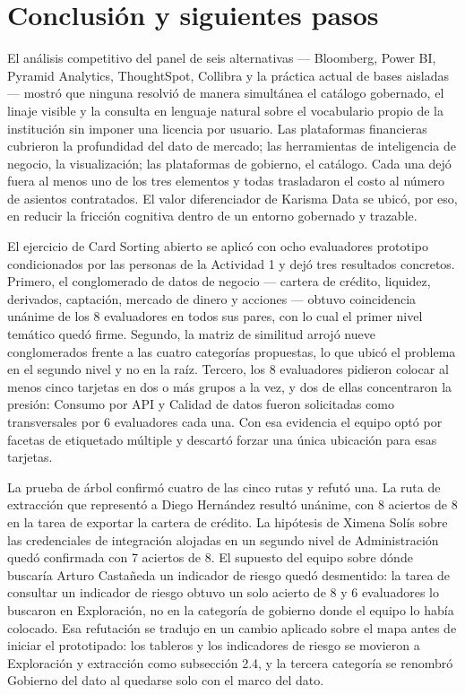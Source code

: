 \section{Conclusión y siguientes pasos}

El análisis competitivo del panel de seis alternativas --- Bloomberg, Power BI, Pyramid Analytics, ThoughtSpot, Collibra y la práctica actual de bases aisladas --- mostró que ninguna resolvió de manera simultánea el catálogo gobernado, el linaje visible y la consulta en lenguaje natural sobre el vocabulario propio de la institución sin imponer una licencia por usuario. Las plataformas financieras cubrieron la profundidad del dato de mercado; las herramientas de inteligencia de negocio, la visualización; las plataformas de gobierno, el catálogo. Cada una dejó fuera al menos uno de los tres elementos y todas trasladaron el costo al número de asientos contratados. El valor diferenciador de Karisma Data se ubicó, por eso, en reducir la fricción cognitiva dentro de un entorno gobernado y trazable.

El ejercicio de Card Sorting abierto se aplicó con ocho evaluadores prototipo condicionados por las personas de la Actividad 1 y dejó tres resultados concretos. Primero, el conglomerado de datos de negocio --- cartera de crédito, liquidez, derivados, captación, mercado de dinero y acciones --- obtuvo coincidencia unánime de los 8 evaluadores en todos sus pares, con lo cual el primer nivel temático quedó firme. Segundo, la matriz de similitud arrojó nueve conglomerados frente a las cuatro categorías propuestas, lo que ubicó el problema en el segundo nivel y no en la raíz. Tercero, los 8 evaluadores pidieron colocar al menos cinco tarjetas en dos o más grupos a la vez, y dos de ellas concentraron la presión: Consumo por API y Calidad de datos fueron solicitadas como transversales por 6 evaluadores cada una. Con esa evidencia el equipo optó por facetas de etiquetado múltiple y descartó forzar una única ubicación para esas tarjetas.

La prueba de árbol confirmó cuatro de las cinco rutas y refutó una. La ruta de extracción que representó a Diego Hernández resultó unánime, con 8 aciertos de 8 en la tarea de exportar la cartera de crédito. La hipótesis de Ximena Solís sobre las credenciales de integración alojadas en un segundo nivel de Administración quedó confirmada con 7 aciertos de 8. El supuesto del equipo sobre dónde buscaría Arturo Castañeda un indicador de riesgo quedó desmentido: la tarea de consultar un indicador de riesgo obtuvo un solo acierto de 8 y 6 evaluadores lo buscaron en Exploración, no en la categoría de gobierno donde el equipo lo había colocado. Esa refutación se tradujo en un cambio aplicado sobre el mapa antes de iniciar el prototipado: los tableros y los indicadores de riesgo se movieron a Exploración y extracción como subsección 2.4, y la tercera categoría se renombró Gobierno del dato al quedarse solo con el marco del dato.

